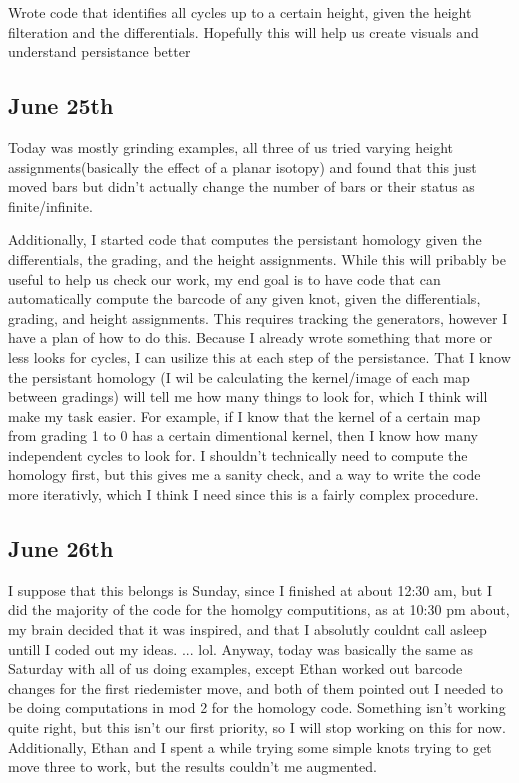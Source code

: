 \documentclass[11pt,oneside]{amsart}
\begin{document}
Wrote code that identifies all cycles up to a certain height, given the height filteration and the differentials. Hopefully this will help us create visuals and understand persistance better




\subsection{June 25th}

Today was mostly grinding examples, all three of us tried varying height assignments(basically the effect of a planar isotopy) and found that this just moved bars but didn't actually change the number of bars or their status as finite/infinite. 

Additionally, I started code that computes the persistant homology given the differentials, the grading, and the height assignments. While this will pribably be useful to help us check our work, my end goal is to have code that can automatically compute the barcode of any given knot, given the differentials, grading, and height assignments. This requires tracking the generators, however I have a plan of how to do this. Because I already wrote something that more or less looks for cycles, I can usilize this at each step of the persistance. That I know the persistant homology (I wil be calculating the kernel/image of each map between gradings) will tell me how many things to look for, which I think will make my task easier. For example, if I know that the kernel of a certain map from grading 1 to 0 has a certain dimentional kernel, then I know how many independent cycles to look for. I shouldn't technically need to compute the homology first, but this gives me a sanity check, and a way to write the code more iterativly, which I think I need since this is a fairly complex procedure.





\subsection{June 26th}

I suppose that this belongs is Sunday, since I finished at about 12:30 am, but I did the majority of the code for the homolgy computitions, as at 10:30 pm about, my brain decided that it was inspired, and that I absolutly couldnt call asleep untill I coded out my ideas.  ... lol.  Anyway, today was basically the same as Saturday with all of us doing examples, except Ethan worked out barcode changes for the first riedemister move, and both of them pointed out I needed to be doing computations in mod 2 for the homology code. Something isn't working quite right, but this isn't our first priority, so I will stop working on this for now. Additionally, Ethan and I spent a while trying some simple knots trying to get move three to work, but the results couldn't me augmented. 
\end{document}
